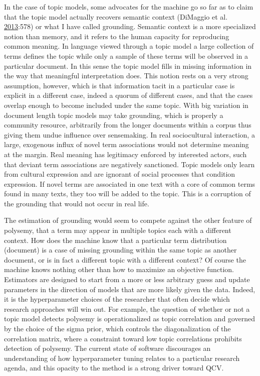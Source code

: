 \documentclass[]{book}
\theoremstyle{definition}
\theoremstyle{definition}
\theoremstyle{definition}
\theoremstyle{remark}
\begin{document}
In the case of topic models, some advocates for the machine go so far as
to claim that the topic model actually recovers semantic context
(DiMaggio et al.
\protect\hyperlink{ref-DiMaggio2013Exploiting}{2013}:578) or what I have
called grounding. Semantic context is a more specialized notion than
memory, and it refers to the human capacity for reproducing common
meaning. In language viewed through a topic model a large collection of
terms defines the topic while only a sample of these terms will be
observed in a particular document. In this sense the topic model fills
in missing information in the way that meaningful interpretation does.
This notion rests on a very strong assumption, however, which is that
information tacit in a particular case is explicit in a different case,
indeed a quorum of different cases, and that the cases overlap enough to
become included under the same topic. With big variation in document
length topic models may take grounding, which is properly a community
resource, arbitrarily from the longer documents within a corpus thus
giving them undue influence over sensemaking. In real sociocultural
interaction, a large, exogenous influx of novel term associations would
not determine meaning at the margin. Real meaning has legitimacy
enforced by interested actors, such that deviant term associations are
negatively sanctioned. Topic models only learn from cultural expression
and are ignorant of social processes that condition expression. If novel
terms are associated in one text with a core of common terms found in
many texts, they too will be added to the topic. This is a corruption of
the grounding that would not occur in real life.

The estimation of grounding would seem to compete against the other
feature of polysemy, that a term may appear in multiple topics each with
a different context. How does the machine know that a particular term
distribution (document) is a case of missing grounding within the same
topic as another document, or is in fact a different topic with a
different context? Of course the machine knows nothing other than how to
maximize an objective function. Estimators are designed to start from a
more or less arbitrary guess and update parameters in the direction of
models that are more likely given the data. Indeed, it is the
hyperparameter choices of the researcher that often decide which
research approaches will win out. For example, the question of whether
or not a topic model detects polysemy is operationalized as topic
correlation and governed by the choice of the sigma prior, which
controls the diagonalization of the correlation matrix, where a
constraint toward low topic correlations prohibits detection of
polysemy. The current state of software discourages an understanding of
how hyperparameter tuning relates to a particular research agenda, and
this opacity to the method is a strong driver toward QCV.
\end{document}

